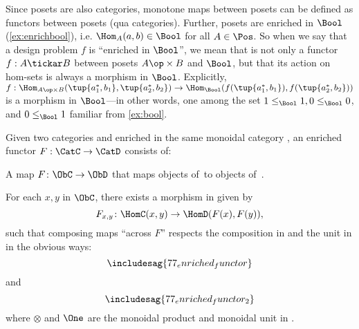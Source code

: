 Since posets are also categories, monotone maps between posets can be defined as functors between posets (qua categories). Further, posets are enriched in $\Bool$ (\cref{ex:enrichbool}), i.e. $\Hom_A(a,b) \in \Bool$ for all $A \in \Pos$. So when we say that a design problem $f$ is ``enriched in $\Bool$'', we mean that is not only a functor $f : A \tickar B$ between posets $A\op \times B$ and $\Bool$, but that its action on hom-sets is always a morphism in $\Bool$. Explicitly, $f : \Hom_{A\op \times B}(\tup{a_1^*,b_1}, \tup{a_2^*,b_2}) \to \Hom_\Bool(f(\tup{a_1^*,b_1}), f(\tup{a_2^*,b_2}))$ is a morphism in $\Bool$---in other words, one among the set $1 \leq_\Bool 1, 0 \leq_\Bool 0$, and $0 \leq_\Bool 1$ familiar from \cref{ex:bool}.

\begin{shaded}
\begin{definition}
\label{defn:enrichedfunctor}
Given two categories \CatC and \CatD enriched in the same monoidal category \CatV, an enriched functor $F: \CatC \to \CatD$ consists of:
\begin{compactenum}
\item A map $F\colon \ObC \to \ObD$ that maps objects of~\CatC to objects of~\CatD.
\item For each $x, y$ in $\ObC$, there exists a morphism in \CatV given by
\begin{equation}
    F_{x,y} \colon \HomC(x,y) \to \HomD(F(x), F(y)),
\end{equation}
such that composing maps ``across $F$'' respects the composition in \CatC and the unit in \CatV in the obvious ways:
    \begin{equation}
        \includesag{77_enriched_functor}
    \end{equation}
and
    \begin{equation}
        \includesag{77_enriched_functor_2}
    \end{equation}
where $\otimes$ and $\One$ are the monoidal product and monoidal unit in \CatV.
\end{compactenum}
\end{definition}
\end{shaded}

